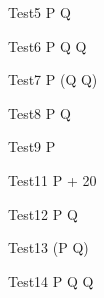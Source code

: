  \begin{circus}
    \circprocess Test5 \circdef  {} \rcirctime \circstartby P  \circseq Q\\
 \end{circus}


\begin{circus}
   \circprocess Test6 \circdef  P \circseq Q \circseq {} \rcirctime \circstartby Q\\
\end{circus}
 
\begin{circus}
   \circprocess Test7 \circdef  P \circseq (Q \circseq {} \rcirctime \circstartby Q)\\
\end{circus} 
 
 \begin{circus}
    \circprocess Test8 \circdef  {} \rcirctime \circstartby P \circseq {} \rcirctime \circstartby Q\\
 \end{circus}


 
\begin{circus}
   \circprocess Test9 \circdef  P \circendby {} \rcirctime   \\
\end{circus}
% 



\begin{circus}
   \circprocess Test11 \circdef  P \circendby {} + 20 \rcirctime   \\
\end{circus}

 
\begin{circus}
   \circprocess Test12 \circdef  P \circseq Q \circendby {} \rcirctime  \\
\end{circus}

\begin{circus}
   \circprocess Test13 \circdef  (P \circseq Q) \circendby {} \rcirctime \\
\end{circus}


\begin{circus}
    \circprocess Test14 \circdef  P \circseq Q \circendby {} \rcirctime \circseq Q \\
 \end{circus}

